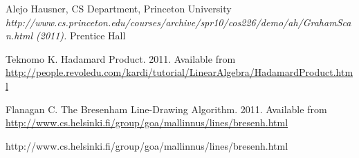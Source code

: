 
\begin{thebibliography}{4}
 Alejo Hausner, CS Department, Princeton University
 \emph{http://www.cs.princeton.edu/courses/archive/spr10/cos226/demo/ah/GrahamScan.html (2011).} Prentice Hall
 
 Teknomo K. Hadamard Product. 2011. Available from \url{http://people.revoledu.com/kardi/tutorial/LinearAlgebra/HadamardProduct.html} 

 Flanagan C. The Bresenham Line-Drawing Algorithm. 2011. Available from \url{http://www.cs.helsinki.fi/group/goa/mallinnus/lines/bresenh.html} 
 
 
http://www.cs.helsinki.fi/group/goa/mallinnus/lines/bresenh.html 
 
\end{thebibliography}
